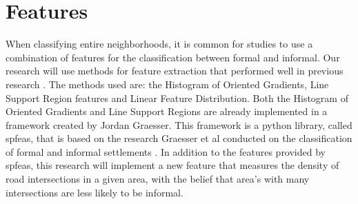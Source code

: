 \section{Features}

When classifying entire neighborhoods, it is common for studies to use
a combination of features for the classification between formal and informal.
Our research will use methods for feature extraction that performed well in
previous research \cite{graesser2012image}. The methods used are: the Histogram
of Oriented Gradients, Line Support Region features and Linear Feature
Distribution. Both the Histogram of Oriented Gradients and Line Support Regions
are already implemented in a framework created by Jordan Graesser. This
framework is a python library, called spfeas, that is based on the
research Graesser et al conducted on the classification of formal and informal
settlements \cite{graesser2012image}. In addition to the features provided by
spfeas, this research will implement a new feature that measures the density of
road intersections in a given area, with the belief that area's with many
intersections are less likely to be informal.









